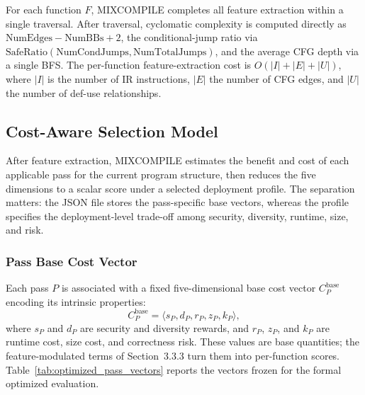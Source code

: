 \documentclass[pdflatex,sn-mathphys-num]{sn-jnl}
\theoremstyle{thmstyleone}%
\theoremstyle{thmstyletwo}%
\theoremstyle{thmstylethree}%
\begin{document}
For each function $F$, MIXCOMPILE completes all feature extraction within a single
traversal. After traversal, cyclomatic complexity is computed directly as
$\text{NumEdges} - \text{NumBBs} + 2$, the conditional-jump ratio via
$\text{SafeRatio}(\text{NumCondJumps}, \text{NumTotalJumps})$, and the average CFG
depth via a single BFS. The per-function feature-extraction cost is $O(|I| + |E| +
|U|)$, where $|I|$ is the number of IR instructions, $|E|$ the number of CFG edges,
and $|U|$ the number of def-use relationships.

\subsection{Cost-Aware Selection Model}
\label{sec:costmodel}

After feature extraction, MIXCOMPILE estimates the benefit and cost of each applicable
pass for the current program structure, then reduces the five dimensions to a scalar
score under a selected deployment profile. The separation matters: the JSON file
stores the pass-specific base vectors, whereas the profile specifies the
deployment-level trade-off among security, diversity, runtime, size, and risk.

\subsubsection{Pass Base Cost Vector}

Each pass $P$ is associated with a fixed five-dimensional base cost vector
$C_P^{\text{base}}$ encoding its intrinsic properties:
\begin{equation}
C_P^{\text{base}} = \langle s_P, d_P, r_P, z_P, k_P \rangle ,
\label{eq:cost_vector}
\end{equation}
where $s_P$ and $d_P$ are security and diversity rewards, and $r_P$, $z_P$, and
$k_P$ are runtime cost, size cost, and correctness risk. These values are base
quantities; the feature-modulated terms of Section~3.3.3 turn them into
per-function scores. Table~\ref{tab:optimized_pass_vectors}
reports the vectors frozen for the formal optimized evaluation.
\end{document}
